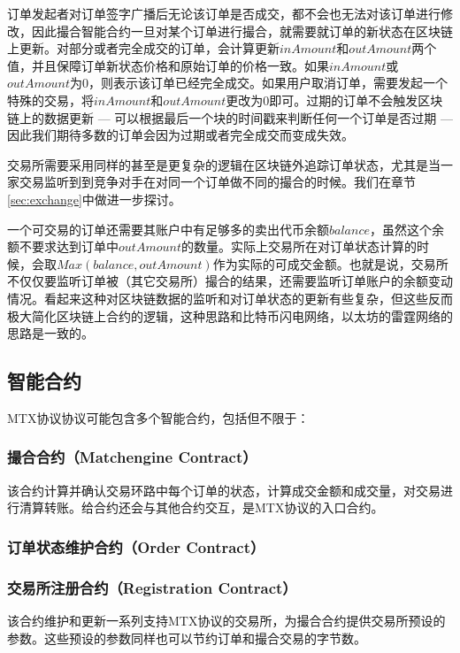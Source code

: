 \documentclass[UTF8,nofonts]{ctexart}
\begin{document}
订单发起者对订单签字广播后无论该订单是否成交，都不会也无法对该订单进行修改，因此撮合智能合约一旦对某个订单进行撮合，就需要就订单的新状态在区块链上更新。对部分或者完全成交的订单，会计算更新$inAmount$和$outAmount$两个值，并且保障订单新状态价格和原始订单的价格一致。如果$inAmount$或$outAmount$为0，则表示该订单已经完全成交。如果用户取消订单，需要发起一个特殊的交易，将$inAmount$和$outAmount$更改为0即可。过期的订单不会触发区块链上的数据更新 --- 可以根据最后一个块的时间戳来判断任何一个订单是否过期 --- 因此我们期待多数的订单会因为过期或者完全成交而变成失效。

交易所需要采用同样的甚至是更复杂的逻辑在区块链外追踪订单状态，尤其是当一家交易监听到到竞争对手在对同一个订单做不同的撮合的时候。我们在章节\ref{sec:exchange}中做进一步探讨。

一个可交易的订单还需要其账户中有足够多的卖出代币余额$balance$，虽然这个余额不要求达到订单中$outAmount$的数量。实际上交易所在对订单状态计算的时候，会取$Max(balance, outAmount)$作为实际的可成交金额。也就是说，交易所不仅仅要监听订单被（其它交易所）撮合的结果，还需要监听订单账户的余额变动情况。看起来这种对区块链数据的监听和对订单状态的更新有些复杂，但这些反而极大简化区块链上合约的逻辑，这种思路和比特币闪电网络，以太坊的雷霆网络的思路是一致的。


\subsection{智能合约\label{sec:contracts}}

MTX协议协议可能包含多个智能合约，包括但不限于：

\subsubsection{撮合合约（Matchengine Contract）} 

该合约计算并确认交易环路中每个订单的状态，计算成交金额和成交量，对交易进行清算转账。给合约还会与其他合约交互，是MTX协议的入口合约。

\subsubsection{订单状态维护合约（Order Contract）}

\subsubsection{交易所注册合约（Registration Contract）}
该合约维护和更新一系列支持MTX协议的交易所，为撮合合约提供交易所预设的参数。这些预设的参数同样也可以节约订单和撮合交易的字节数。
\end{document}
